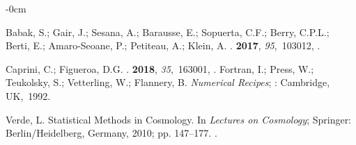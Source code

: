 \documentclass[universe,article,accept,moreauthors,pdftex]{Definitions/mdpi}
\begin{document}
\begin{adjustwidth}{-\extralength}{0cm}
\begin{thebibliography}{999}
Babak, S.; Gair, J.; Sesana, A.; Barausse, E.; Sopuerta, C.F.; Berry, C.P.L.;
  Berti, E.; Amaro-Seoane, P.; Petiteau, A.; Klein, A.
.
 {\bf 2017}, {\em 95},~103012,
{\href{https://doi.org/10.1103/PhysRevD.95.103012}{}}.

Caprini, C.; Figueroa, D.G.
.
 {\bf 2018}, {\em 35},~163001,
{\href{https://doi.org/10.1088/1361-6382/aac608}{}}.
\newpage
{}
Fortran, I.; Press, W.; Teukolsky, S.; Vetterling, W.; Flannery, B.
\newblock \emph{Numerical Recipes};
: Cambridge, \mbox{UK,  {1992}.}

Verde, L.
\newblock Statistical Methods in Cosmology. In {\em Lectures on Cosmology};
  Springer: Berlin/Heidelberg, Germany, 2010; pp. 147--177.
\newblock
{\href{https://doi.org/10.1007/978-3-642-10598-2_4}{}}.

\end{thebibliography}
\PublishersNote{}
\end{adjustwidth}




\end{document}
